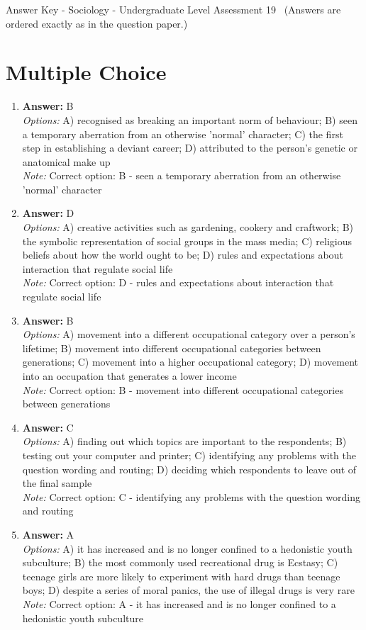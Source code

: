 \documentclass[12pt]{article}
\begin{document}
\begin{center}
Answer Key - Sociology - Undergraduate Level Assessment 19 \
\small (Answers are ordered exactly as in the question paper.)
\end{center}

\section*{Multiple Choice}
\begin{enumerate}[label=\arabic*.]
\item \textbf{Answer:} B
\\ \textit{Options:} A) recognised as breaking an important norm of behaviour; B) seen a temporary aberration from an otherwise 'normal' character; C) the first step in establishing a deviant career; D) attributed to the person's genetic or anatomical make up
\\ \textit{Note:} Correct option: B - seen a temporary aberration from an otherwise 'normal' character
\item \textbf{Answer:} D
\\ \textit{Options:} A) creative activities such as gardening, cookery and craftwork; B) the symbolic representation of social groups in the mass media; C) religious beliefs about how the world ought to be; D) rules and expectations about interaction that regulate social life
\\ \textit{Note:} Correct option: D - rules and expectations about interaction that regulate social life
\item \textbf{Answer:} B
\\ \textit{Options:} A) movement into a different occupational category over a person's lifetime; B) movement into different occupational categories between generations; C) movement into a higher occupational category; D) movement into an occupation that generates a lower income
\\ \textit{Note:} Correct option: B - movement into different occupational categories between generations
\item \textbf{Answer:} C
\\ \textit{Options:} A) finding out which topics are important to the respondents; B) testing out your computer and printer; C) identifying any problems with the question wording and routing; D) deciding which respondents to leave out of the final sample
\\ \textit{Note:} Correct option: C - identifying any problems with the question wording and routing
\item \textbf{Answer:} A
\\ \textit{Options:} A) it has increased and is no longer confined to a hedonistic youth subculture; B) the most commonly used recreational drug is Ecstasy; C) teenage girls are more likely to experiment with hard drugs than teenage boys; D) despite a series of moral panics, the use of illegal drugs is very rare
\\ \textit{Note:} Correct option: A - it has increased and is no longer confined to a hedonistic youth subculture
\end{enumerate}
\end{document}
